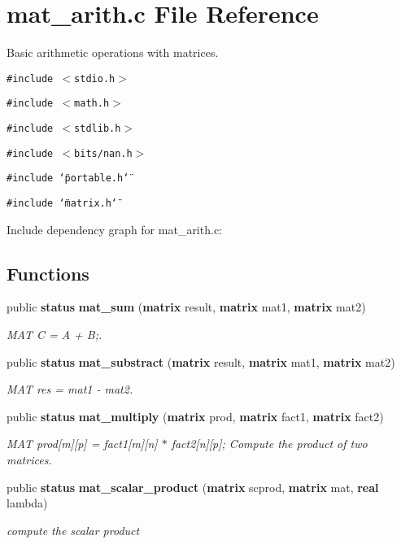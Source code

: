 \section{mat\_\-arith.c File Reference}
\label{mat__arith_8c}
Basic arithmetic operations with matrices. 


{\tt \#include $<$stdio.h$>$}\par
{\tt \#include $<$math.h$>$}\par
{\tt \#include $<$stdlib.h$>$}\par
{\tt \#include $<$bits/nan.h$>$}\par
{\tt \#include \char`\"{}portable.h\char`\"{}}\par
{\tt \#include \char`\"{}matrix.h\char`\"{}}\par


Include dependency graph for mat\_\-arith.c:\subsection*{Functions}
\begin{CompactItemize}
\item 
public {\bf status} {\bf mat\_\-sum} ({\bf matrix} result, {\bf matrix} mat1, {\bf matrix} mat2)
\begin{CompactList}\small\item\em MAT C = A + B;.\item\end{CompactList}\item 
public {\bf status} {\bf mat\_\-substract} ({\bf matrix} result, {\bf matrix} mat1, {\bf matrix} mat2)
\begin{CompactList}\small\item\em MAT res = mat1 - mat2.\item\end{CompactList}\item 
public {\bf status} {\bf mat\_\-multiply} ({\bf matrix} prod, {\bf matrix} fact1, {\bf matrix} fact2)
\begin{CompactList}\small\item\em MAT prod[m][p] = fact1[m][n] $\ast$ fact2[n][p]; Compute the product of two matrices.\item\end{CompactList}\item 
public {\bf status} {\bf mat\_\-scalar\_\-product} ({\bf matrix} scprod, {\bf matrix} mat, {\bf real} lambda)
\begin{CompactList}\small\item\em compute the scalar product\item\end{CompactList}\end{CompactItemize}


